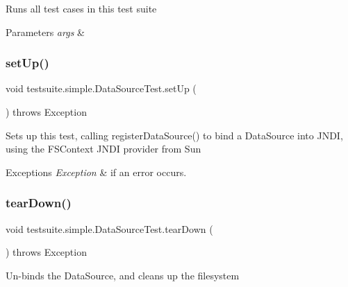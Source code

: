 Runs all test cases in this test suite


\begin{DoxyParams}{Parameters}
{\em args} & \\
\hline
\end{DoxyParams}
\mbox{\label{classtestsuite_1_1simple_1_1_data_source_test_af972007f4b839815702c12a48fc1b77d}} 
\subsubsection{\texorpdfstring{set\+Up()}{setUp()}}
{\footnotesize\ttfamily void testsuite.\+simple.\+Data\+Source\+Test.\+set\+Up (\begin{DoxyParamCaption}{ }\end{DoxyParamCaption}) throws Exception}

Sets up this test, calling register\+Data\+Source() to bind a Data\+Source into J\+N\+DI, using the F\+S\+Context J\+N\+DI provider from Sun


\begin{DoxyExceptions}{Exceptions}
{\em Exception} & if an error occurs. \\
\hline
\end{DoxyExceptions}
\mbox{\label{classtestsuite_1_1simple_1_1_data_source_test_abed70f64e5fb149eef73ed2e7ccf3d59}} 
\subsubsection{\texorpdfstring{tear\+Down()}{tearDown()}}
{\footnotesize\ttfamily void testsuite.\+simple.\+Data\+Source\+Test.\+tear\+Down (\begin{DoxyParamCaption}{ }\end{DoxyParamCaption}) throws Exception}

Un-\/binds the Data\+Source, and cleans up the filesystem


